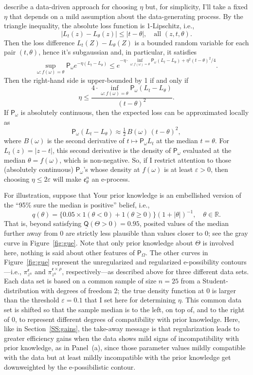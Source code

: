 \documentclass[a4paper, 12pt]{article}
\theoremstyle{plain}
\theoremstyle{definition}
\theoremstyle{remark}
\newcommand{\prob}{\mathsf{P}}
\newcommand{\RR}{\mathbb{R}}
\newcommand{\eps}{\varepsilon}
\newcommand{\lprior}{\underline{\mathsf{Q}}}
\newcommand{\eval}{\mathfrak{e}}
\begin{document}
\citet{dey.gue} describe a data-driven approach for choosing $\eta$ but, for simplicity, I'll take a fixed $\eta$ that depends on a mild assumption about the data-generating process.  By the triangle inequality, the absolute loss function is 1-Lipschitz, i.e., 
\[ \bigl| L_t(z) - L_\theta(z) \bigr| \leq |t - \theta|, \quad \text{all $(z,t,\theta)$}. \]
Then the loss difference $L_t(Z) - L_\theta(Z)$ is a bounded random variable for each pair $(t,\theta)$, hence it's subgaussian and, in particular, it satisfies 
\[ \sup_{\omega: f(\omega) = \theta} \prob_\omega e^{-\eta(L_t - L_\theta)} \leq e^{-\eta \cdot \inf_{\omega: f(\omega)=\theta} \prob_\omega (L_t - L_\theta) + \eta^2 (t - \theta)^2 / 4}. \]
Then the right-hand side is upper-bounded by 1 if and only if
\[ \eta \leq \frac{4 \cdot \inf_{\omega: f(\omega)=\theta} \prob_\omega (L_t - L_\theta)}{(t-\theta)^2}. \]
If $\prob_\omega$ is absolutely continuous, then the expected loss can be approximated locally as
\[ \prob_\omega(L_t - L_\theta) \approx \tfrac12 \, B(\omega) \, (t-\theta)^2, \]
where $B(\omega)$ is the second derivative of $t \mapsto \prob_\omega L_t$ at the median $t=\theta$.  For $L_t(z) = |z-t|$, this second derivative is the density of $\prob_\omega$ evaluated at the median $\theta=f(\omega)$, which is non-negative.  So, if I restrict attention to those (absolutely continuous) $\prob_\omega$'s whose density at $f(\omega)$ is at least $\eps > 0$, then choosing $\eta \leq 2\eps$ will make $\eval_\theta^n$ an e-process.  %

For illustration, suppose that Your prior knowledge is an embellished version of the ``95\% sure the median is positive'' belief, i.e., 
\[ q(\theta) = \{0.05 \times 1(\theta < 0) + 1(\theta \geq 0)\} (1 + |\theta|)^{-1}, \quad \theta \in \RR. \]
That is, beyond satisfying $\lprior(\Theta > 0) = 0.95$, posited values of the median further away from 0 are strictly less plausible than values closer to 0; see the gray curve in Figure~\ref{fig:gue}.  Note that only prior knowledge about $\Theta$ is involved here, nothing is said about other features of $\prob_\Omega$.  The other curves in Figure~\ref{fig:gue} represent the unregularized and regularized e-possibility contours---i.e., $\pi_{z^n}^\eval$ and $\pi_{z^n}^{\eval \times \rho}$, respectively---as described above for three different data sets.  Each data set is based on a common sample of size $n=25$ from a Student- distribution with degrees of freedom 2; the true density function at 0 is larger than the threshold $\eps = 0.1$ that I set here for determining $\eta$.  This common data set is shifted so that the sample median is to the left, on top of, and to the right of 0, to represent different degrees of compatibility with prior knowledge.  Here, like in Section~\ref{SS:gains}, the take-away message is that regularization leads to greater efficiency gains when the data shows mild signs of incompatibility with prior knowledge, as in Panel~(a), since those parameter values mildly compatible with the data but at least mildly incompatible with the prior knowledge get downweighted by the e-possibilistic contour. 
\end{document}
